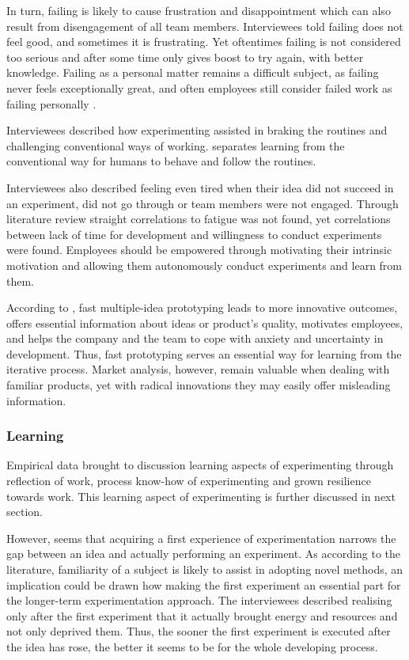 In turn, failing is likely to cause frustration and disappointment which can also result from disengagement of all team members. Interviewees told failing does not feel good, and sometimes it is frustrating. Yet oftentimes failing is not considered too serious and after some time only gives boost to try again, with better knowledge. 
Failing as a personal matter remains a difficult subject, as failing never feels exceptionally great, and often employees still consider failed work as failing personally \citep{farson2002failuretolerantleader}. 

Interviewees described how experimenting assisted in braking the routines and challenging conventional ways of working. \citet{dewey1956human} separates learning from the conventional way for humans to behave and follow the routines. 

Interviewees also described feeling even tired when their idea did not succeed in an experiment, did not go through or team members were not engaged. Through literature review straight correlations to fatigue was not found, yet correlations between lack of time for development and willingness to conduct experiments were found. Employees should be empowered through motivating their intrinsic motivation and allowing them autonomously conduct experiments and learn from them. \citep{amabile1998kill,jung2001transformational} 

According to \citet{quinn1985managing}, fast multiple-idea prototyping leads to more innovative outcomes, offers essential information about ideas or product's quality, motivates employees, and helps the company and the team to cope with anxiety and uncertainty in development. Thus, fast prototyping serves an essential way for learning from the iterative process. Market analysis, however, remain valuable when dealing with familiar products, yet with radical innovations they may easily offer misleading information. \citep{quinn1985managing}

\subsubsection*{Learning}
Empirical data brought to discussion learning aspects of experimenting through reflection of work, process know-how of experimenting and grown resilience towards work. This learning aspect of experimenting is further discussed in next section. 

However, seems that acquiring a first experience of experimentation narrows the gap between an idea and actually performing an experiment. As according to the literature, familiarity of a subject is likely to assist in adopting novel methods, an implication could be drawn how making the first experiment an essential part for the longer-term experimentation approach. The interviewees described realising only after the first experiment that it actually brought energy and resources and not only deprived them. Thus, the sooner the first experiment is executed after the idea has rose, the better it seems to be for the whole developing process.

